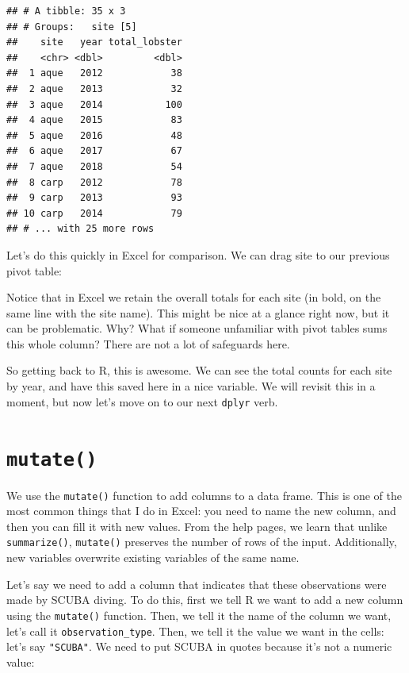 \documentclass[]{book}
\newenvironment{Shaded}{\begin{snugshade}}{\end{snugshade}}
\newcommand{\DataTypeTok}[1]{\textcolor[rgb]{0.13,0.29,0.53}{#1}}
\newcommand{\KeywordTok}[1]{\textcolor[rgb]{0.13,0.29,0.53}{\textbf{#1}}}
\newcommand{\NormalTok}[1]{#1}
\newcommand{\OperatorTok}[1]{\textcolor[rgb]{0.81,0.36,0.00}{\textbf{#1}}}
\newcommand{\StringTok}[1]{\textcolor[rgb]{0.31,0.60,0.02}{#1}}
\begin{document}
\begin{verbatim}
## # A tibble: 35 x 3
## # Groups:   site [5]
##    site   year total_lobster
##    <chr> <dbl>         <dbl>
##  1 aque   2012            38
##  2 aque   2013            32
##  3 aque   2014           100
##  4 aque   2015            83
##  5 aque   2016            48
##  6 aque   2017            67
##  7 aque   2018            54
##  8 carp   2012            78
##  9 carp   2013            93
## 10 carp   2014            79
## # ... with 25 more rows
\end{verbatim}

Let's do this quickly in Excel for comparison. We can drag site to our previous pivot table:

Notice that in Excel we retain the overall totals for each site (in bold, on the same line with the site name). This might be nice at a glance right now, but it can be problematic. Why? What if someone unfamiliar with pivot tables sums this whole column? There are not a lot of safeguards here.

So getting back to R, this is awesome. We can see the total counts for each site by year, and have this saved here in a nice variable. We will revisit this in a moment, but now let's move on to our next \texttt{dplyr} verb.

\hypertarget{mutate}{%
\section{\texorpdfstring{\texttt{mutate()}}{mutate()}}\label{mutate}}

We use the \texttt{mutate()} function to add columns to a data frame. This is one of the most common things that I do in Excel: you need to name the new column, and then you can fill it with new values. From the help pages, we learn that unlike \texttt{summarize()}, \texttt{mutate()} preserves the number of rows of the input. Additionally, new variables overwrite existing variables of the same name.

Let's say we need to add a column that indicates that these observations were made by SCUBA diving. To do this, first we tell R we want to add a new column using the \texttt{mutate()} function. Then, we tell it the name of the column we want, let's call it \texttt{observation\_type}. Then, we tell it the value we want in the cells: let's say \texttt{"SCUBA"}. We need to put SCUBA in quotes because it's not a numeric value:

\begin{Shaded}
\end{Shaded}
\end{document}
